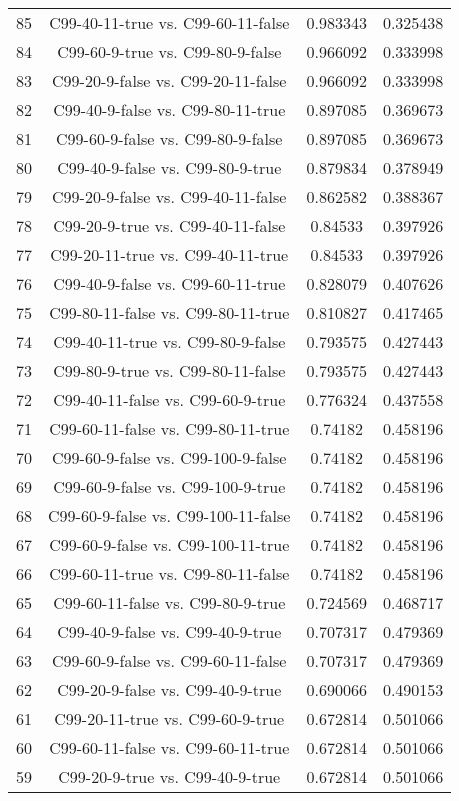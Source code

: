 \documentclass[a4paper,10pt]{article}
\begin{document}
\begin{landscape}
\begin{table}[!htp]
\begin{tabular}{cccc}
85&C99-40-11-true vs. C99-60-11-false&0.983343&0.325438\\
84&C99-60-9-true vs. C99-80-9-false&0.966092&0.333998\\
83&C99-20-9-false vs. C99-20-11-false&0.966092&0.333998\\
82&C99-40-9-false vs. C99-80-11-true&0.897085&0.369673\\
81&C99-60-9-false vs. C99-80-9-false&0.897085&0.369673\\
80&C99-40-9-false vs. C99-80-9-true&0.879834&0.378949\\
79&C99-20-9-false vs. C99-40-11-false&0.862582&0.388367\\
78&C99-20-9-true vs. C99-40-11-false&0.84533&0.397926\\
77&C99-20-11-true vs. C99-40-11-true&0.84533&0.397926\\
76&C99-40-9-false vs. C99-60-11-true&0.828079&0.407626\\
75&C99-80-11-false vs. C99-80-11-true&0.810827&0.417465\\
74&C99-40-11-true vs. C99-80-9-false&0.793575&0.427443\\
73&C99-80-9-true vs. C99-80-11-false&0.793575&0.427443\\
72&C99-40-11-false vs. C99-60-9-true&0.776324&0.437558\\
71&C99-60-11-false vs. C99-80-11-true&0.74182&0.458196\\
70&C99-60-9-false vs. C99-100-9-false&0.74182&0.458196\\
69&C99-60-9-false vs. C99-100-9-true&0.74182&0.458196\\
68&C99-60-9-false vs. C99-100-11-false&0.74182&0.458196\\
67&C99-60-9-false vs. C99-100-11-true&0.74182&0.458196\\
66&C99-60-11-true vs. C99-80-11-false&0.74182&0.458196\\
65&C99-60-11-false vs. C99-80-9-true&0.724569&0.468717\\
64&C99-40-9-false vs. C99-40-9-true&0.707317&0.479369\\
63&C99-60-9-false vs. C99-60-11-false&0.707317&0.479369\\
62&C99-20-9-false vs. C99-40-9-true&0.690066&0.490153\\
61&C99-20-11-true vs. C99-60-9-true&0.672814&0.501066\\
60&C99-60-11-false vs. C99-60-11-true&0.672814&0.501066\\
59&C99-20-9-true vs. C99-40-9-true&0.672814&0.501066\\

\end{tabular}
\end{table}
\end{landscape}
\end{document}
